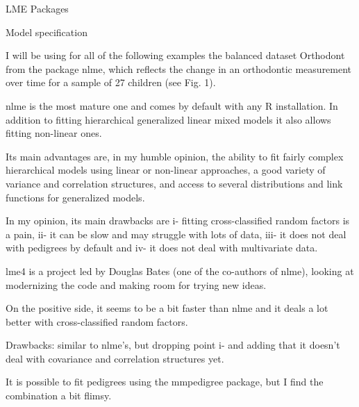 LME Packages

Model specification

I will be using for all of the following examples the balanced dataset Orthodont from the package 
nlme, which reflects the change in an orthodontic measurement over time for a sample of 27 children 
(see Fig. 1).


nlme is the most mature one and comes by default with any R installation. 
In addition to fitting hierarchical generalized linear mixed models it also allows 
fitting non-linear ones. 

Its main advantages are, in my humble opinion, the ability to fit fairly complex hierarchical 
models using linear or non-linear approaches, a good  variety of variance and correlation 
structures, and access to several distributions and link functions for generalized models. 

In my opinion, its main drawbacks are 
i- fitting cross-classified random factors is a pain, 
ii- it can be slow and may struggle with lots of data, 
iii- it does not deal with pedigrees by default and 
iv- it does not deal with multivariate data.

lme4 is a project led by Douglas Bates (one of the co-authors of nlme), 
looking at modernizing the code and making room for trying new ideas. 

On the positive side, it seems to be a bit faster than nlme and it deals a lot
better with cross-classified random factors. 

Drawbacks: similar to nlme’s, but dropping point 
i- and adding that it doesn’t deal with covariance and correlation structures yet. 

It is possible to fit pedigrees using the mmpedigree package, but I find the combination a bit flimsy.
